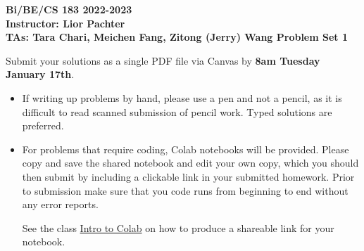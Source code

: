 \documentclass[11pt]{exam}
\begin{document}
\begin{center}

     \textbf{Bi/BE/CS 183 2022-2023\\ Instructor: Lior Pachter\\ TAs: Tara Chari, Meichen Fang, Zitong (Jerry) Wang \vskip 0.15in Problem Set 1}

\end{center}


 \vskip 0.15in


Submit your solutions as a single PDF file via Canvas by {\bf 8am Tuesday January 17th}. 
\begin{itemize}
  \item If writing up problems by hand, please use a pen and not a pencil, as it is difficult to read scanned submission of pencil work. Typed solutions are preferred.
  \item For problems that require coding, Colab notebooks will be provided. Please copy and save the shared notebook and edit your own copy, which you should then submit by including a clickable link in your submitted homework. Prior to submission make sure that you code runs from beginning to end without any error reports.
  
  See the class \href{https://caltech.instructure.com/courses/5055}{Intro to Colab} on how to produce a shareable link for your notebook.

\end{itemize}
\end{document}
